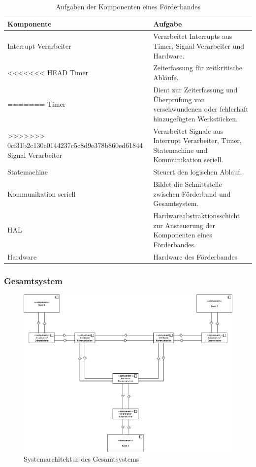 \documentclass[a4paper, 11pt]{article}
\begin{document}
\begin{table}[H]
\center
    \begin{tabularx}{\textwidth}{|l|X|}
        \hline
        \textbf{Komponente}&\textbf{Aufgabe}\\
        \hline
        Interrupt Verarbeiter&Verarbeitet Interrupts aus Timer, Signal Verarbeiter und Hardware.\\
        \hline
<<<<<<< HEAD
        Timer&Zeiterfassung für zeitkritische Abläufe.\\
=======
        Timer&Dient zur Zeiterfassung und Überprüfung von verschwundenen oder fehlerhaft hinzugefügten 
        Werkstücken.\\
>>>>>>> 0cf31b2c130c0144237c5c8d9e378b860ed61844
        \hline
        Signal Verarbeiter&Verarbeitet Signale aus Interrupt Verarbeiter, Timer, Statemachine und Kommunikation seriell.\\
        \hline
        Statemachine&Steuert den logischen Ablauf.\\
        \hline
        Kommunikation seriell&Bildet die Schnittstelle zwischen Förderband und Gesamtsystem.\\
        \hline
        HAL&Hardwareabstraktionsschicht zur Ansteuerung der Komponenten eines Förderbandes.\\
        \hline
        Hardware&Hardware des Förderbandes\\
        \hline
        \end{tabularx}
    \caption{Aufgaben der Komponenten eines Förderbandes}
    \label{archinterntcomp}
\end{table}

\newpage

\subsubsection{Gesamtsystem}

\begin{figure}[H]
\centering 
    \includegraphics[scale=0.60]{images/SW_Architektur/Gesamtsystem.jpg}
    \caption{Systemarchitektur des Gesamtsystems}
    \label{archtotal}
\end{figure}
\end{document}

